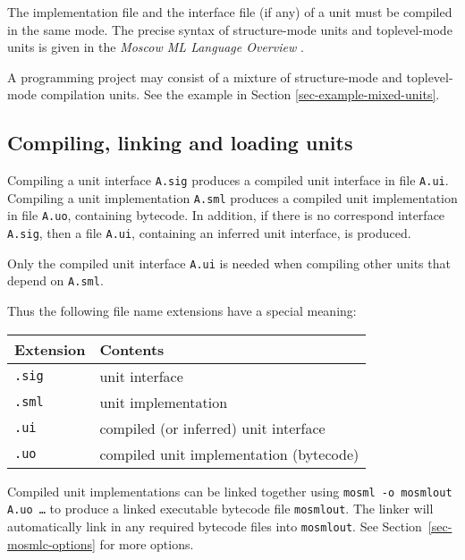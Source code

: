 \documentclass[fleqn,a4paper]{article}
\begin{document}
\noindent 
The implementation file and the interface file (if any) of a unit must
be compiled in the same mode.  The precise syntax of structure-mode
units and toplevel-mode units is given in the \emph{Moscow ML Language
  Overview} \cite{MoscowML:2000:MoscowMLLanguage}.

A programming project may consist of a mixture of structure-mode and
toplevel-mode compilation units. See the example in Section  \ref{sec-example-mixed-units}.
 

\subsection{Compiling, linking and loading units}

Compiling a unit interface \texttt{A.sig} produces a compiled unit
interface in file \texttt{A.ui}\@.  Compiling a unit implementation
\texttt{A.sml} produces a compiled unit implementation in file
\texttt{A.uo}, containing bytecode.  In addition, if there is no
correspond interface \texttt{A.sig}, then a file \texttt{A.ui},
containing an inferred unit interface, is produced.

Only the compiled unit interface \texttt{A.ui} is needed when
compiling other units that depend on \texttt{A.sml}.

Thus the following file name extensions have a special meaning: 

\begin{center}
\begin{tabular}{|l|l|}\hline
Extension & Contents\\\hline
\texttt{.sig} & unit interface\\
\texttt{.sml} & unit implementation\\
\texttt{.ui}  & compiled (or inferred) unit interface\\
\texttt{.uo}  & compiled unit implementation (bytecode)\\\hline
\end{tabular}
\end{center}

\noindent 
Compiled unit implementations can be linked together using {\tt mosml
  -o mosmlout A.uo \ldots} to produce a linked executable bytecode
file {\tt mosmlout}.  The linker will automatically link in any
required bytecode files into {\tt mosmlout}.  See
Section~\ref{sec-mosmlc-options} for more options.
\end{document}
